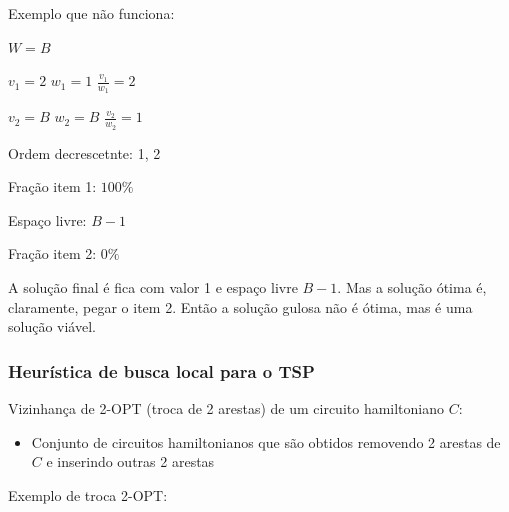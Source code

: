\begin{algorithm}
    \SetAlgoLined

\end{algorithm}

Exemplo que não funciona:

\begin{example}
    \begin{multicols}{2}
        $W=B$

        $v_1 = 2$ \quad $w_1 = 1$ \quad $\frac{v_1}{w_1}=2$

        $v_2 = B$ \quad $w_2 = B$ \quad $\frac{v_2}{w_2}=1$

        \columnbreak

        Ordem decrescetnte: 1, 2

        Fração item 1: $100\%$

        Espaço livre: $B - 1$

        Fração item 2: $0\%$
    \end{multicols}
\end{example}

A solução final é fica com valor 1 e espaço livre $B-1$. Mas a solução ótima é, claramente, pegar o item 2. Então a solução gulosa não é ótima, mas é uma solução viável.

\subsubsection{Heurística de busca local para o TSP}

Vizinhança de 2-OPT (troca de 2 arestas) de um circuito hamiltoniano $C$:

\begin{itemize}
    \item Conjunto de circuitos hamiltonianos que são obtidos removendo 2 arestas de $C$ e inserindo outras 2 arestas
\end{itemize}

Exemplo de troca 2-OPT:

